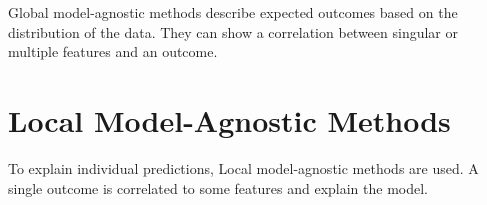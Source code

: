 Global model-agnostic methods describe expected outcomes based on the distribution of the data. They can show a correlation between singular or multiple features and an outcome.

%
%
%
%
%
%



\section{Local Model-Agnostic Methods}

To explain individual predictions, Local model-agnostic methods are used. A single outcome is correlated to some features and explain the model.

%
%
%
%
%


